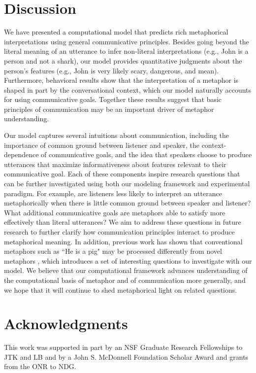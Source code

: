 \documentclass[10pt,letterpaper]{article}
\begin{document}
\section{Discussion}
We have presented a computational model that predicts rich metaphorical interpretations using general communicative principles. Besides going beyond the literal meaning of an utterance to infer non-literal interpretations (e.g., John is a person and not a shark), our model provides quantitative judgments about the person's features (e.g., John is very likely scary, dangerous, and mean). Furthermore, behavioral results show that the interpretation of a metaphor is shaped in part by the conversational context, which our model naturally accounts for using communicative goals. Together these results suggest that basic principles of communication may be an important driver of metaphor understanding.

Our model captures several intuitions about communication, including the importance of common ground between listener and speaker, the context-dependence of communicative goals, and the idea that speakers choose to produce utterances that maximize informativeness about features relevant to their communicative goal. Each of these components inspire research questions that can be further investigated using both our modeling framework and experimental paradigm. For example, are listeners less likely to interpret an utterance metaphorically when there is little common ground between speaker and listener? What additional communicative goals are metaphors able to satisfy more effectively than literal utterances? We aim to address these questions in future research to further clarify how communication principles interact to produce metaphorical meaning. In addition, previous work has shown that conventional metaphors such as ``He is a pig" may be processed differently from novel metaphors \cite{bowdle2005career}, which introduces a set of interesting questions to investigate with our model. We believe that our computational framework advances understanding of the computational basis of metaphor and of communication more generally, and we hope that it will continue to shed metaphorical light on related questions.

\section{Acknowledgments}
This work was supported in part by an NSF Graduate Research Fellowships to JTK and LB and by a John S. McDonnell Foundation Scholar Award and grants from the ONR to NDG.



\setlength{\bibleftmargin}{.125in}
\setlength{\bibindent}{-\bibleftmargin}


\end{document}
